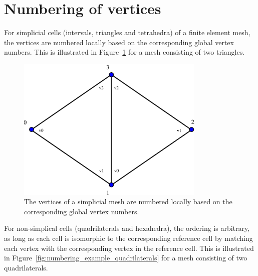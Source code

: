\section{Numbering of vertices}

For simplicial cells (intervals, triangles and tetrahedra) of a finite
element mesh, the vertices are numbered locally based on the
corresponding global vertex numbers. This is illustrated in
Figure~\ref{fig:numbering_example_triangles} for a mesh consisting of
two triangles.
 
\begin{figure}[htbp]
  \begin{center}
    \includegraphics[width=9cm]{eps/numbering_example_triangles.eps}
    \caption{The vertices of a simplicial mesh are numbered locally
      based on the corresponding global vertex numbers.}
    \label{fig:numbering_example_triangles}
  \end{center}
\end{figure}

For non-simplical cells (quadrilaterals and hexahedra), the ordering
is arbitrary, as long as each cell is isomorphic to the corresponding
reference cell by matching each vertex with the corresponding vertex
in the reference cell. This is illustrated in
Figure~\ref{fig:numbering_example_quadrilaterals} for a mesh
consisting of two quadrilaterals.

